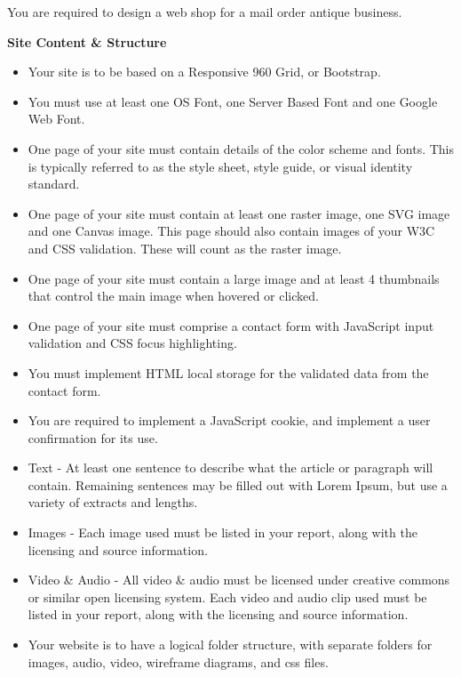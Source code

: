 You are required to design a web shop for a mail order antique business.  





\vspace{.5cm}

\textbf{Site Content \& Structure}\\

\begin{itemize}
	\item Your site is to be based on a Responsive 960 Grid, or Bootstrap.
	\item You must use at least one OS Font, one Server Based Font and one Google Web Font.
	\item One page of your site must contain details of the color scheme and fonts. This is typically referred to as the style sheet, style guide, or visual identity standard. 
	\item One page of your site must contain at least one raster image, one SVG image and one Canvas image.  This page should also contain images of your W3C and CSS validation.  These will count as the raster image.
	\item One page of your site must contain a large image and at least 4 thumbnails that control the main image when hovered or clicked.
	\item One page of your site must comprise a contact form with JavaScript input validation and CSS focus highlighting.
	\item You must implement HTML local storage for the validated data from the contact form.
	\item You are required to implement a JavaScript cookie, and implement a user confirmation for its use. 
	\item Text - At least one sentence to describe what the article or paragraph will contain.  Remaining sentences may be filled out with Lorem Ipsum, but use a variety of extracts and lengths.
	\item Images - Each image used must be listed in your report, along with the licensing and source information.   
	\item Video \& Audio - All video \& audio must be licensed under creative commons or similar open licensing system.  Each video and audio clip used must be listed in your report, along with the licensing and source information.
	\item Your website is to have a logical folder structure, with separate folders for images, audio, video, wireframe diagrams, and css files. 
\end{itemize}


